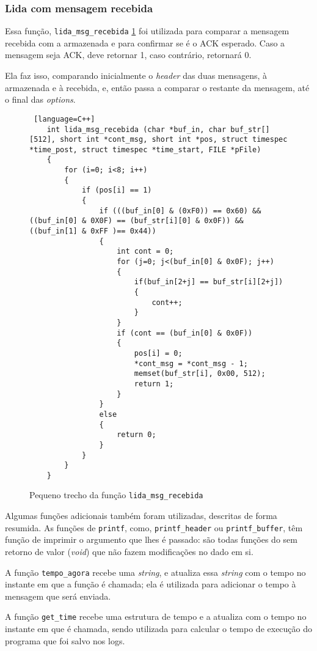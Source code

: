 \subsubsection{Lida com mensagem recebida}

Essa função, \texttt{lida\_msg\_recebida} \ref{code:lida_msg_recebida} foi utilizada para comparar a mensagem recebida com a armazenada e para confirmar se é o ACK esperado. Caso a mensagem seja ACK, deve retornar 1, caso contrário, retornará 0.

Ela faz isso, comparando inicialmente o \textit{header} das duas mensagens, à armazenada e à recebida, e, então passa a comparar o restante da mensagem, até o final das \textit{options}.

\begin{figure}[!htb]
	\begin{lstlisting} [language=C++]
	int lida_msg_recebida (char *buf_in, char buf_str[][512], short int *cont_msg, short int *pos, struct timespec *time_post, struct timespec *time_start, FILE *pFile)
	{
		for (i=0; i<8; i++)
		{
			if (pos[i] == 1)
			{
				if (((buf_in[0] & (0xF0)) == 0x60) && ((buf_in[0] & 0X0F) == (buf_str[i][0] & 0x0F)) && ((buf_in[1] & 0xFF )== 0x44))
				{
					int cont = 0;
					for (j=0; j<(buf_in[0] & 0x0F); j++)
					{
						if(buf_in[2+j] == buf_str[i][2+j])
						{
							cont++;
						}
					}
					if (cont == (buf_in[0] & 0x0F))
					{
						pos[i] = 0;
						*cont_msg = *cont_msg - 1;
						memset(buf_str[i], 0x00, 512);
						return 1;
					}
				}
				else
				{
					return 0;
				}
			}
		}
	}
	\end{lstlisting}
	\caption{Pequeno trecho da função \texttt{lida\_msg\_recebida}}
\label{code:lida_msg_recebida}
\end{figure}

Algumas funções adicionais também foram utilizadas, descritas de forma resumida.
As funções de \texttt{printf}, como, \texttt{printf\_header} ou \texttt{printf\_buffer}, têm função de imprimir o argumento que lhes é passado: são todas funções do sem retorno de valor (\textit{void}) que não fazem modificações no dado em si.

A função \texttt{tempo\_agora} recebe uma \textit{string}, e atualiza essa \textit{string} com o tempo no instante em que a função é chamada; ela é utilizada para adicionar o tempo à mensagem que será enviada.

A função \texttt{get\_time} recebe uma estrutura de tempo e a atualiza com o tempo no instante em que é chamada, sendo utilizada para calcular o tempo de execução do programa que foi salvo nos logs.

